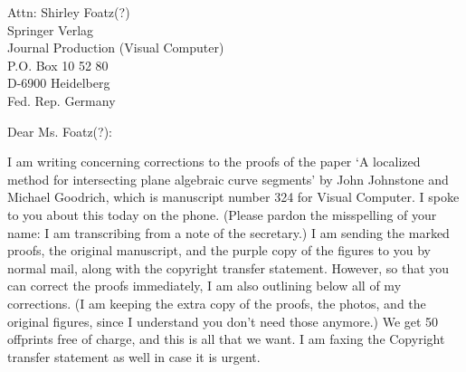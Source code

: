 \signature{Prof. John K. Johnstone\\jj@cs.jhu.edu}

\begin{letter}
{Attn: Shirley Foatz(?)\\
Springer Verlag\\
Journal Production (Visual Computer)\\
P.O. Box 10 52 80\\
D-6900 Heidelberg\\
Fed. Rep. Germany
}

\opening{Dear Ms. Foatz(?):}

I am writing concerning corrections to the proofs of the paper
`A localized method for intersecting plane algebraic curve segments'
by John Johnstone and Michael Goodrich, which is manuscript number 324
for Visual Computer.
I spoke to you about this today on the phone.
(Please pardon the misspelling of your name: I am transcribing from a
note of the secretary.)
I am sending the marked proofs, the original manuscript, and the purple
copy of the figures to you
by normal mail, along with the copyright transfer statement.
However, so that you can correct the proofs immediately, I am also
outlining below all of my corrections.
(I am keeping the extra copy of the proofs, the photos, and the original
figures, since I understand you don't need those anymore.)
We get 50 offprints free of charge, and this is all that we want.
I am faxing the Copyright transfer statement as well in case it is urgent.


\end{letter}
